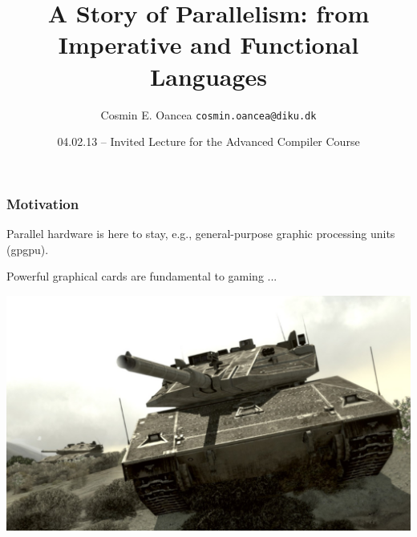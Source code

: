 \documentclass{beamer}
\title[Parallelism History]{A Story of Parallelism: from\\ Imperative and Functional Languages}
\author[C.Oancea]{Cosmin E. Oancea \texttt{cosmin.oancea@diku.dk}}
\institute{HIPERFIT, Department of Computer Science\\University of Copenhagen}
\date[04.02.13 - Invited Lecture]{04.02.13 -- Invited Lecture for the Advanced Compiler Course}
\begin{document}
\titleslide


\begin{frame}
  \frametitle{Motivation}
  

Parallel hardware is here to stay, e.g., general-purpose graphic processing units ({\sc gpgpu}).

\bigskip

Powerful graphical cards are fundamental to gaming ...

\center \includegraphics[height=30ex]{ParTeaserFigs/tank}  %

\end{frame}
\end{document}
